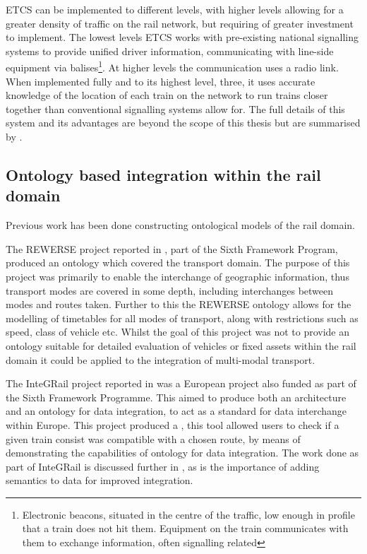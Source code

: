 ETCS can be implemented to different levels, with higher levels allowing for a greater density of traffic on the rail network, but requiring of greater investment to implement. The lowest levels ETCS works with pre-existing national signalling systems to provide unified driver information, communicating with line-side equipment via balises\footnote{Electronic beacons, situated in the centre of the traffic, low enough in profile that a train does not hit them. Equipment on the train communicates with them to exchange information, often signalling related}. At higher levels the communication uses a radio link. When implemented fully and to its highest level, three, it uses accurate knowledge of the location of each train on the network to run trains closer together than conventional signalling systems allow for. The full details of this system and its advantages are beyond the scope of this thesis but are summarised by \citet{EC2011}.


\subsection{Ontology based integration within the rail domain}
\label{sec:prevonto}
Previous work has been done constructing ontological models of the rail domain.

The REWERSE project reported in \citet{Lorenz2005a}, part of the Sixth Framework Program, produced an ontology which covered the transport domain. The purpose of this project was primarily to enable the interchange of geographic information, thus transport modes are covered in some depth, including interchanges between modes and routes taken. Further to this the REWERSE ontology allows for the modelling of timetables for all modes of transport, along with restrictions such as speed, class of vehicle etc. Whilst the goal of this project was not to provide an ontology suitable for detailed evaluation of vehicles or fixed assets within the rail domain it could be applied to the integration of multi-modal transport.

The InteGRail project reported in \citet{Kopf2010} was a European project also funded as part of the Sixth Framework Programme. This aimed to produce both an architecture and an ontology for data integration, to act as a standard for data interchange within Europe. This project produced a , this tool allowed users to check if a given train consist was compatible with a chosen route, by means of demonstrating the capabilities of ontology for data integration. The work done as part of InteGRail is discussed further in \citet{Verstichel2011}, as is the importance of adding semantics to data for improved integration. 

